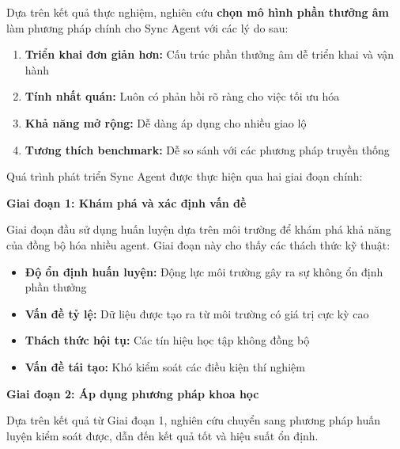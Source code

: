 Dựa trên kết quả thực nghiệm, nghiên cứu \textbf{chọn mô hình phần thưởng âm} làm phương pháp chính cho Sync Agent với các lý do sau:

\begin{enumerate}
    \item \textbf{Triển khai đơn giản hơn:} Cấu trúc phần thưởng âm dễ triển khai
        và vận hành
    \item \textbf{Tính nhất quán:} Luôn có phản hồi rõ ràng cho việc tối ưu hóa

    \item \textbf{Khả năng mở rộng:} Dễ dàng áp dụng cho nhiều giao lộ

    \item \textbf{Tương thích benchmark:} Dễ so sánh với các phương pháp
        truyền thống
\end{enumerate}


Quá trình phát triển Sync Agent được thực hiện qua hai giai đoạn chính:

\textbf{Giai đoạn 1: Khám phá và xác định vấn đề}

Giai đoạn đầu sử dụng huấn luyện dựa trên môi trường để khám phá khả năng của
đồng bộ hóa nhiều agent. Giai đoạn này cho thấy các thách thức kỹ thuật:

\begin{itemize}
    \item \textbf{Độ ổn định huấn luyện:} Động lực môi trường gây ra sự không ổn định phần thưởng
    \item \textbf{Vấn đề tỷ lệ:} Dữ liệu được tạo ra từ môi trường có giá trị cực kỳ cao
    \item \textbf{Thách thức hội tụ:} Các tín hiệu học tập không đồng bộ
    \item \textbf{Vấn đề tái tạo:} Khó kiểm soát các điều kiện thí nghiệm
\end{itemize}

\textbf{Giai đoạn 2: Áp dụng phương pháp khoa học}

Dựa trên kết quả từ Giai đoạn 1, nghiên cứu chuyển sang phương pháp huấn luyện kiểm soát
được, dẫn đến kết quả tốt và hiệu suất ổn định.

